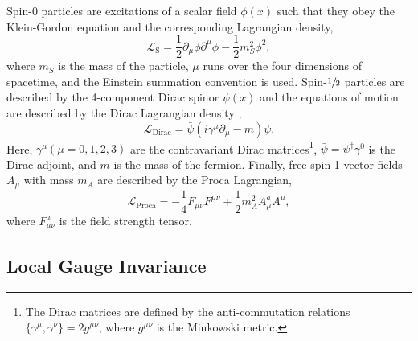 Spin-0 particles are excitations of a scalar field $\phi(x)$ such that they obey the Klein-Gordon equation \cite{Klein1926} and the corresponding Lagrangian density,
\begin{equation}
	\label{eq:scalar_lagrangian}
	\mathcal{L}_\text{S} = \frac{1}{2} \partial_\mu \phi \partial^\mu \phi - \frac{1}{2} m_S^2 \phi^2,
\end{equation}
where $m_S$ is the mass of the particle, $\mu$ runs over the four dimensions of spacetime, and the Einstein summation convention is used.
Spin-$\sfrac{1}{2}$ particles are described by the 4-component Dirac spinor $\psi(x)$ and the equations of motion are described by the Dirac Lagrangian density \cite{Dirac1928},
\begin{equation}
	\label{eq:dirac_lagrangian}
	\mathcal{L}_\text{Dirac} = \bar{\psi} (i \gamma^\mu \partial_\mu - m) \psi.
\end{equation}
Here, $\gamma^\mu(\mu=0,1,2,3)$ are the contravariant Dirac matrices\footnote{The Dirac matrices are defined by the anti-commutation relations $\{\gamma^\mu, \gamma^\nu\} = 2 g^{\mu\nu}$, where $g^{\mu\nu}$ is the Minkowski metric.}, $\bar{\psi} = \psi^\dagger \gamma^0$ is the Dirac adjoint, and $m$ is the mass of the fermion.
Finally, free spin-1 vector fields $A_\mu$ with mass $m_A$ are described by the Proca Lagrangian,
\begin{equation}
	\label{eq:proca_lagrangian}
	\mathcal{L}_\text{Proca} = -\frac{1}{4} F_{\mu\nu} F^{\mu\nu} + \frac{1}{2} m_A^2 A_\mu^a A^{\mu},
\end{equation}
where $F_{\mu\nu}^a$ is the field strength tensor.

\subsection{Local Gauge Invariance}

